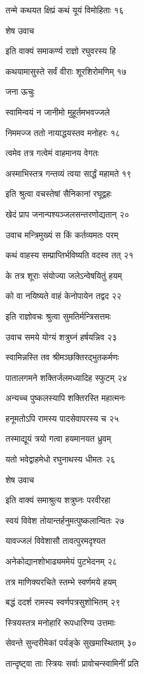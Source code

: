 तन्मे कथयत क्षिप्रं कथं यूयं विमोहिताः १६

शेष उवाच

इति वाक्यं समाकर्ण्य राज्ञो रघुवरस्य हि

कथयामासुस्ते सर्वं वीराः शूरशिरोमणिम् १७

जना ऊचुः

स्वामिन्वयं न जानीमो मुहूर्तमभवज्जले

निममज्ज ततो नायाद्धयस्तव मनोहरः १८

त्वमेव तत्र गत्वेमं वाहमानय वेगतः

अस्माभिस्तत्र गन्तव्यं त्वया सार्द्धं महामते १९

इति श्रुत्वा वचस्तेषां सैनिकानां रघूद्वहः

खेदं प्राप जनान्पश्यञ्जलसन्तरणोद्यतान् २०

उवाच मन्त्रिमुख्यं स किं कर्तव्यमतः परम्

कथं वाहस्य सम्प्राप्तिर्भविष्यति वदस्व तत् २१

के तत्र शूराः संयोज्या जलेऽन्वेषयितुं हयम्

को वा नयिष्यते वाहं केनोपायेन तद्वद २२

इति राज्ञोवचः श्रुत्वा सुमतिर्मन्त्रिसत्तमः

उवाच समये योग्यं शत्रुघ्नं हर्षयन्निव २३

स्वामिन्नस्ति तव श्रीमञ्छक्तिरद्भुतकर्मणः

पातालगमने शक्तिर्जलमध्यादिह स्फुटम् २४

अन्यच्च पुष्कलस्यापि शक्तिरस्ति महात्मनः

हनूमतोऽपि रामस्य पादसेवापरस्य च २५

तस्माद्यूयं त्रयो गत्वा हयमानयत ध्रुवम्

यतो भवेद्वाहमेधो रघुनाथस्य धीमतः २६

शेष उवाच

इति वाक्यं समाश्रुत्य शत्रुघ्नः परवीरहा

स्वयं विवेश तोयान्तर्हनुमत्पुष्कलान्वितः २७

यावज्जलं विवेशासौ तावत्पुरमदृश्यत

अनेकोद्यानशोभाढ्यममेयं पुटभेदनम् २८

तत्र माणिक्यरचिते स्तम्भे स्वर्णमये हयम्

बद्धं ददर्श रामस्य स्वर्णपत्रसुशोभितम् २९

स्त्रियस्तत्र मनोहारि रूपधारिण्य उत्तमाः

सेवन्ते सुन्दरीमेकां पर्यङ्के सुखमास्थिताम् ३०

तान्दृष्ट्वा ताः स्त्रियः सर्वाः प्रावोचन्स्वामिनीं प्रति

